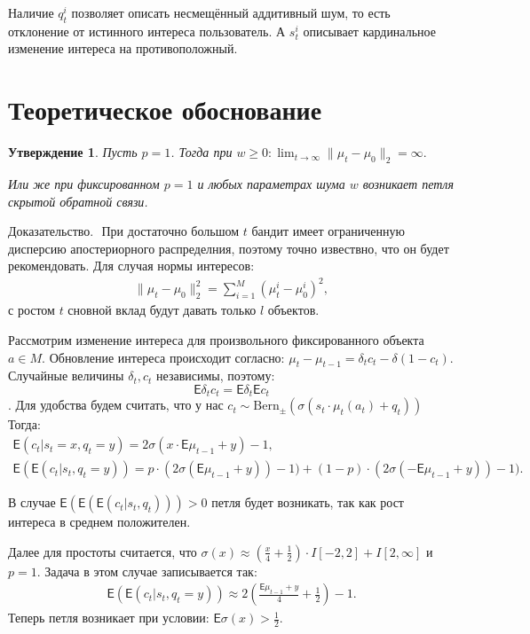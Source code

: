 \documentclass[12pt, twoside]{article}
\newtheorem{statement}{Утверждение}
\begin{document}
Наличие $q_t^i$ позволяет описать несмещённый аддитивный шум, то есть отклонение от истинного интереса пользователь. А $s_t^i$ описывает кардинальное изменение интереса на противоположный. 


\section{Теоретическое обоснование}
\begin{statement}
  Пусть  $p=1$. Тогда при $w \geq 0 : \lim_{t \to \infty} \|\mu_t - \mu_0 \|_2 = \infty.$

  Или же при фиксированном $ p = 1$ и любых параметрах шума $w$ возникает петля скрытой обратной связи. 
\end{statement}
$\textbf{Доказательство. }$ При достаточно большом $t$ бандит имеет ограниченную дисперсию апостериорного распределния, поэтому точно извествно, что он будет рекомендовать.
Для случая нормы интересов: 
\begin{gather*}
  \|\mu_t - \mu_0 \|^2_2 = \sum_{i=1}^M (\mu_t^i - \mu_0^i)^2,
\end{gather*}
с ростом $t$ сновной вклад будут давать только $l$ объектов. 

Рассмотрим изменение интереса для произвольного фиксированного объекта $a \in M$. 
Обновление интереса происходит согласно: $\mu_t - \mu_{t-1} = \delta_t c_t - \delta (1 - c_t)$.
Случайные величины $\delta_t, c_t$ независимы, поэтому: \[\mathsf{E} \delta_t c_t = \mathsf{E} \delta_t \mathsf{E} c_t\]. 
Для удобства будем считать, что у нас $c_t \sim \text{Bern}_{\pm}(\sigma(s_t \cdot \mu_t(a_t) + q_t))$
Тогда: 
\begin{gather*}
  \mathsf{E} (c_t | s_t = x, q_t = y) = 2 \sigma(x \cdot \mathsf{E} \mu_{t-1} + y) - 1, \\
  \mathsf{E} (\mathsf{E} (c_t | s_t, q_t = y)) = p \cdot (2 \sigma(\mathsf{E} \mu_{t-1} + y)) - 1) +  (1-p) \cdot (2 \sigma(- \mathsf{E}\mu_{t-1} + y)) - 1).  
\end{gather*}

В случае $\mathsf{E}(\mathsf{E}(\mathsf{E}(c_t|s_t, q_t))) > 0$ петля будет возникать, так как рост интереса в среднем положителен. 

Далее для простоты считается, что $\sigma(x) \approx \left(\frac{x}{4} + \frac{1}{2} \right) \cdot I[-2, 2] + I[2, \infty]$ и $p = 1$.
Задача в этом случае записывается так:
\begin{gather*}
  \mathsf{E} (\mathsf{E} (c_t | s_t, q_t = y)) \approx  2 \left(\frac{\mathsf{E} \mu_{t-1} + y}{4} + \frac{1}{2}\right) - 1.   
\end{gather*}
Теперь петля возникает при условии: $\mathsf{E}\sigma(x) > \frac{1}{2}$. 
\end{document}
